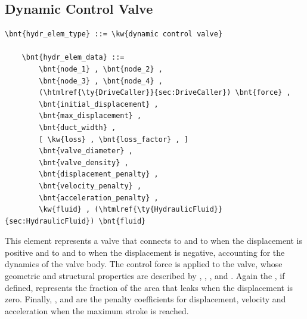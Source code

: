 \subsection{Dynamic Control Valve}
\label{sec:EL:HYDR:DYNAMIC_CONTROL_VALVE}
\begin{Verbatim}[commandchars=\\\{\}]
    \bnt{hydr_elem_type} ::= \kw{dynamic control valve}

    \bnt{hydr_elem_data} ::=
        \bnt{node_1} , \bnt{node_2} ,
        \bnt{node_3} , \bnt{node_4} ,
        (\htmlref{\ty{DriveCaller}}{sec:DriveCaller}) \bnt{force} ,
        \bnt{initial_displacement} ,
        \bnt{max_displacement} ,
        \bnt{duct_width} ,
        [ \kw{loss} , \bnt{loss_factor} , ]
        \bnt{valve_diameter} ,
        \bnt{valve_density} ,
        \bnt{displacement_penalty} ,
        \bnt{velocity_penalty} ,
        \bnt{acceleration_penalty} ,
        \kw{fluid} , (\htmlref{\ty{HydraulicFluid}}{sec:HydraulicFluid}) \bnt{fluid}
\end{Verbatim}
This element represents a valve that connects
 to  and  to 
when the displacement is positive and  to 
and  to  when the displacement is negative,
accounting for the dynamics of the valve body.
The control force  is applied to the valve, whose 
geometric and structural properties are described by 
, ,
,  and .
Again the , if defined, represents the fraction
of the area that leaks when the displacement is zero.
Finally, ,  and 
are the penalty coefficients for displacement, velocity and acceleration
when the maximum stroke is reached.




